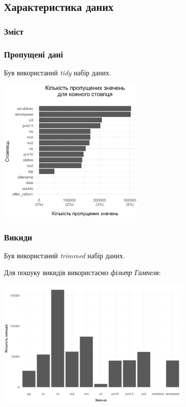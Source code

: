 \documentclass{beamer}
\begin{document}
\begin{frame}
  \section{Характеристика даних}

  \frametitle{Зміст}
  \tableofcontents[currentsection]
\end{frame}

\begin{frame}
  \frametitle{Пропущені дані}

  Був використаний \textit{tidy} набір даних.

  \begin{center}
    \includegraphics[height=2.8in]{plots/missed_data.png}
  \end{center}
\end{frame}

\begin{frame}
  \frametitle{Викиди}

  Був використаний \textit{trimmed} набір даних.

  Для пошуку викидів використаємо \textit{фільтр Гампеля}:

  \begin{center}
    \includegraphics[height=2.5in]{plots/outliers/count-bar.png}
  \end{center}
\end{frame}
\end{document}
